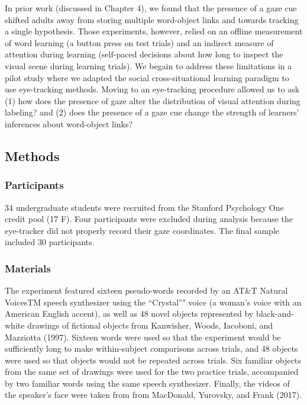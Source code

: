 \documentclass[man,floatsintext]{apa6}
\begin{document}
In prior work (discussed in Chapter 4), we found that the presence of a
gaze cue shifted adults away from storing multiple word-object links and
towards tracking a single hypothesis. Those experiments, however, relied
on an offline measurement of word learning (a button press on test
trials) and an indirect measure of attention during learning (self-paced
decisions about how long to inspect the visual scene during learning
trials). We begain to address these limitations in a pilot study where
we adapted the social cross-situational learning paradigm to use
eye-tracking methods. Moving to an eye-tracking procedure allowed us to
ask (1) how does the presence of gaze alter the distribution of visual
attention during labeling? and (2) does the presence of a gaze cue
change the strength of learners' inferences about word-object links?

\subsection{Methods}\label{methods-1}

\subsubsection{Participants}\label{participants-1}

34 undergraduate students were recruited from the Stanford Psychology
One credit pool (17 F). Four participants were excluded during analysis
because the eye-tracker did not properly record their gaze coordinates.
The final sample included 30 participants.

\subsubsection{Materials}\label{materials-1}

The experiment featured sixteen pseudo-words recorded by an AT\&T
Natural VoicesTM speech synthesizer using the \enquote{Crystal}" voice
(a woman's voice with an American English accent), as well as 48 novel
objects represented by black-and-white drawings of fictional objects
from Kanwisher, Woods, Iacoboni, and Mazziotta (1997). Sixteen words
were used so that the experiment would be sufficiently long to make
within-subject comparisons across trials, and 48 objects were used so
that objects would not be repeated across trials. Six familiar objects
from the same set of drawings were used for the two practice trials,
accompanied by two familiar words using the same speech synthesizer.
Finally, the videos of the speaker's face were taken from from
MacDonald, Yurovsky, and Frank (2017).
\end{document}
